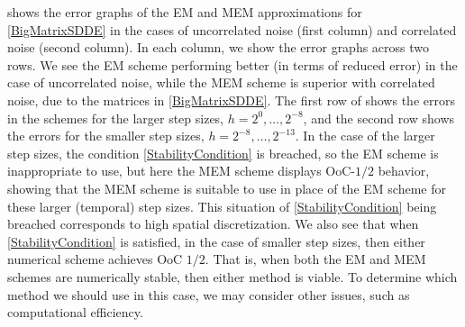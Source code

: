 \documentclass[onefignum]{siamart250211}
\begin{document}
\begin{example}
 shows the error graphs of the EM and MEM approximations for \cref{BigMatrixSDDE} in the cases of uncorrelated noise (first column) and correlated noise (second column). In each column, we show the error graphs across two rows. We see the EM scheme performing better (in terms of reduced error) in the case of uncorrelated noise, while the MEM scheme is superior with correlated noise, due to the matrices in \cref{BigMatrixSDDE}. The first row of  shows the errors in the schemes for the larger step sizes, $h=2^0,\ldots,2^{-8}$, and the second row shows the errors for the smaller step sizes, $h=2^{-8},\ldots,2^{-13}$. In the case of the larger step sizes, the condition \cref{StabilityCondition} is breached, so the EM scheme is inappropriate to use, but here the MEM scheme displays OoC-$1/2$ behavior, showing that the MEM scheme is suitable to use in place of the EM scheme for these larger (temporal) step sizes. This situation of \cref{StabilityCondition} being breached corresponds to high spatial discretization. We also see that when \cref{StabilityCondition} is satisfied, in the case of smaller step sizes, then either numerical scheme achieves OoC $1/2$. That is, when both the EM and MEM schemes are numerically stable, then either method is viable. To determine which method we should use in this case, we may consider other issues, such as computational efficiency.







\end{example}
\end{document}
